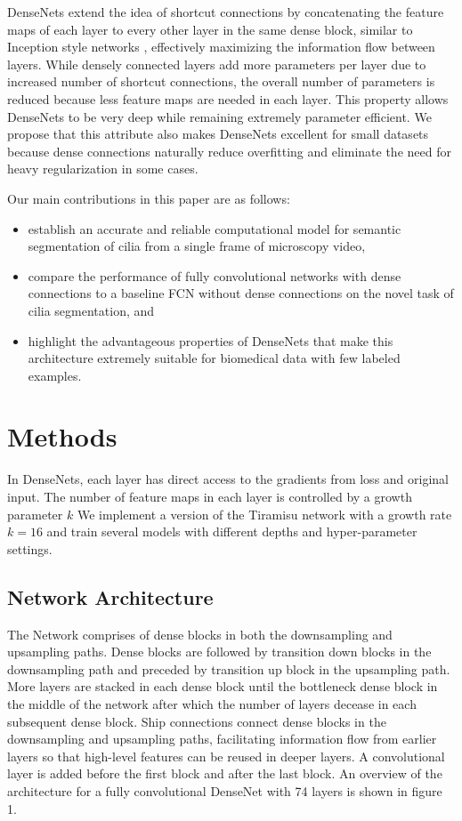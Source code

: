 \documentclass{llncs}
\begin{document}
\par
DenseNets \cite{DenseNet} extend the idea of shortcut connections by concatenating the feature maps of each layer to every other layer in the same dense block, similar to Inception style networks \cite{Inception}, effectively maximizing the information flow between layers. While densely connected layers add more parameters per layer due to increased number of shortcut connections, the overall number of parameters is reduced because less feature maps are needed in each layer. This property allows DenseNets to be very deep while remaining extremely parameter efficient. We propose that this attribute also makes DenseNets excellent for small datasets because dense connections naturally reduce overfitting and eliminate the need for heavy regularization in some cases.    
\par
Our main contributions in this paper are as follows:
\begin{itemize}
\item establish an accurate and reliable computational model for semantic segmentation of cilia from a single frame of microscopy video,
\item compare the performance of fully convolutional networks with dense connections to a baseline FCN without dense connections on the novel task of cilia segmentation, and 
\item highlight the advantageous properties of DenseNets that make this architecture extremely suitable for biomedical data with few labeled examples.  
\end{itemize}


\section{Methods}

In DenseNets, each layer has direct access to the gradients from loss and original input. The number of feature maps in each layer is controlled by a growth parameter $k$ We implement a version of the Tiramisu network \cite{Tiramisu} with a growth rate $k = 16$ and train several models with different depths and hyper-parameter settings. 

\subsection{Network Architecture}
The Network comprises of dense blocks in both the downsampling and upsampling paths. Dense blocks are followed by transition down blocks in the downsampling path and preceded by transition up block in the upsampling path. More layers are stacked in each dense block until the bottleneck dense block in the middle of the network after which the number of layers decease in each subsequent dense block. Ship connections connect dense blocks in the downsampling and upsampling paths, facilitating information flow from earlier layers so that high-level features can be reused in deeper layers. A convolutional layer is added before the first block and after the last block. An overview of the architecture for a fully convolutional DenseNet with 74 layers is shown in figure 1.
\end{document}
